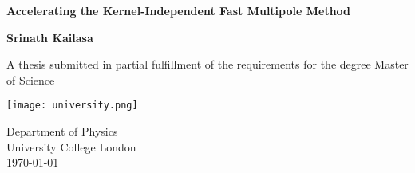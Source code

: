\begin{titlepage}
    \begin{center}
        \vspace*{1cm}

        \Huge
        \textbf{Accelerating the Kernel-Independent Fast Multipole Method}

        \Large
        \vspace{0.5cm}

        \vfill

        \textbf{Srinath Kailasa}

        \vspace{5cm}

        A thesis submitted in partial fulfillment of the requirements for the
        degree Master of Science

        \vspace{0.8cm}

        \texttt{[image: university.png]}

        \large
        Department of Physics\\
        University College London\\
        \today

    \end{center}
 \end{titlepage}